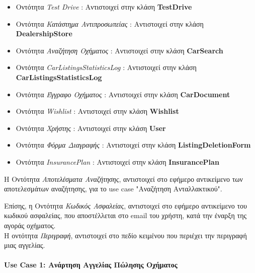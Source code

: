 \documentclass{../ol-softwaremanual}
\begin{document}
\begin{itemize}
		\item Οντότητα \en \textit{Test Drive} \gr : Αντιστοιχεί στην κλάση \en \textbf{TestDrive}\gr
		\item Οντότητα \textit{Κατάστημα Αντιπροσωπείας} : Αντιστοιχεί στην κλάση \en \textbf{DealershipStore}\gr
		\item Οντότητα \textit{Αναζήτηση Οχήματος} : Αντιστοιχεί στην κλάση \en \textbf{CarSearch} \gr
		\item Οντότητα \en \textit{CarListingsStatisticsLog} \gr : Αντιστοιχεί στην κλάση \en \textbf{CarListingsStatisticsLog} \gr		
		\item Οντότητα \textit{Έγγραφο Οχήματος} : Αντιστοιχεί στην κλάση \en \textbf{CarDocument} \gr
		\item Οντότητα \en \textit{Wishlist} \gr : Αντιστοιχεί στην κλάση \en \textbf{Wishlist} \gr
		\item Οντότητα  \textit{Χρήστης} : Αντιστοιχεί στην κλάση \en \textbf{User} \gr
		\item Οντότητα \textit{Φόρμα Διαγραφής} : Αντιστοιχεί στην κλάση \en \textbf{ListingDeletionForm} \gr
		\item Οντότητα \en \textit{InsurancePlan} \gr : Αντιστοιχεί στην κλάση \en \textbf{InsurancePlan} \gr

	\end{itemize}
	
	Η Οντότητα \textit{Αποτελέσματα Αναζήτησης}, αντιστοιχεί στο εφήμερο αντικείμενο των αποτελεσμάτων αναζήτησης, για το \en use case "\gr Αναζήτηση Ανταλλακτικού\en"\gr.
	
	Επίσης, η Οντότητα \textit{Κωδικός Ασφαλείας}, αντιστοιχεί στο εφήμερο αντικείμενο του κωδικού ασφαλείας, που αποστέλλεται στο \en email \gr του χρήστη, κατά την έναρξη της αγοράς οχήματος. \\
	
	Η οντότητα \textit{Περιγραφή}, αντιστοιχεί στο πεδίο κειμένου που περιέχει την περιγραφή μιας αγγελίας.
	
	
	\newpage
	
	\paragraph{\en Use Case 1: \gr Ανάρτηση Αγγελίας Πώλησης Οχήματος}
	\centering
	
\end{document}
